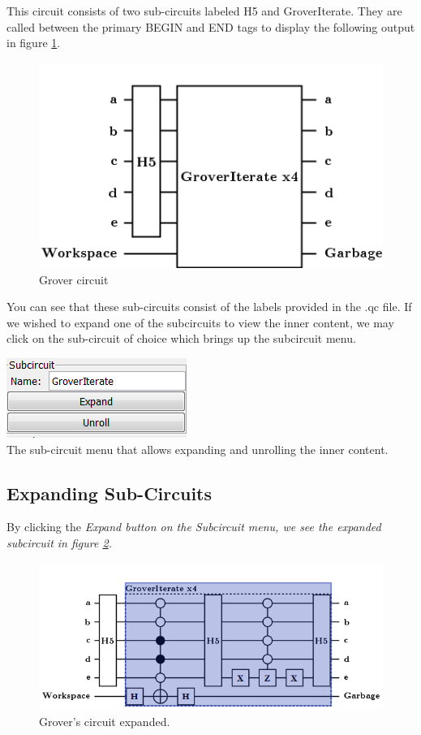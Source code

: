 \documentclass[10pt]{article}
\theoremstyle{definition}
\begin{document}
This circuit consists of two sub-circuits labeled H5 and GroverIterate. They are called between the primary BEGIN and END tags to display the following output in figure \ref{f:grover}.

\begin{figure}
\capstart
\centering
\includegraphics[scale=.5]{Figures/SubCircuits/GroverCircuit}
\caption{Grover circuit}
\label{f:grover}
\end{figure}

You can see that these sub-circuits consist of the labels provided in the .qc file. If we wished to expand one of the subcircuits to view the inner content, we may click on the sub-circuit of choice which brings up the subcircuit menu.

\begin{center}
\includegraphics{Figures/SubCircuits/SubCircuitMenu.png} \\
The sub-circuit menu that allows expanding and unrolling the inner content.
\end{center}

\subsection{Expanding Sub-Circuits}\label{sec:ExpandingSubCircuits}

By clicking the \em Expand \em button on the \em Subcircuit \em menu, we see the expanded subcircuit in figure \ref{f:groverex}.

\begin{figure}
\capstart
\centering
\includegraphics[scale=.5]{Figures/SubCircuits/GroverCircuitExpand}
\caption{Grover's circuit expanded.}
\label{f:groverex}
\end{figure}
\end{document}
